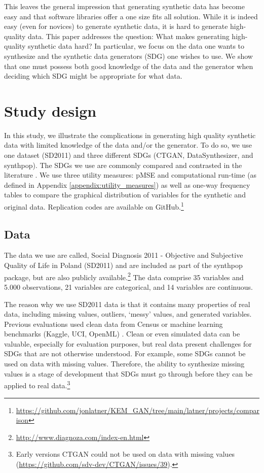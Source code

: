 \documentclass[runningheads]{llncs}
\begin{document}
This leaves the general impression that generating synthetic data has become easy and that software libraries offer a one size fits all solution. While it is indeed easy (even for novices) to generate synthetic data, it is hard to generate high-quality data. This paper addresses the question: What makes generating high-quality synthetic data hard? In particular, we focus on the data one wants to synthesize and the synthetic data generators (SDG) one wishes to use. We show that one must possess both good knowledge of the data and the generator when deciding which SDG might be appropriate for what data. 

\section{Study design}\label{sec:study_design}

In this study, we illustrate the complications in generating high quality synthetic data with limited knowledge of the data and/or the generator.  To do so, we use one dataset (SD2011) and three different SDGs  (CTGAN, DataSynthesizer, and synthpop). The SDGs we use are commonly compared and contrasted in the literature \cite{dankar2021fake,little2022comparing}.  We use three utility measures: pMSE and computational run-time (as defined in Appendix \ref{appendix:utility_measures}) as well as one-way frequency tables to compare the graphical distribution of variables for the synthetic and original data.  Replication codes are available on GitHub.\footnote{\url{https://github.com/jonlatner/KEM_GAN/tree/main/latner/projects/comparison}}

\subsection{Data}

The data we use are called, Social Diagnosis 2011 - Objective and Subjective Quality of Life in Poland (SD2011) and are included as part of the synthpop package, but are also publicly available.\footnote{ \url{http://www.diagnoza.com/index-en.html}}  The data comprise 35 variables and 5.000 observations, 21 variables are categorical, and 14 variables are continuous.  

The reason why we use SD2011 data is that it contains many properties of real data, including missing values, outliers, `messy' values, and generated variables.  Previous evaluations used clean data from Census \cite{little2022comparing} or machine learning benchmarks (Kaggle, UCI, OpenML) \cite{dankar2021fake}.  Clean or even simulated data can be valuable, especially for evaluation purposes, but real data present challenges for SDGs that are not otherwise understood.  For example, some SDGs cannot be used on data with missing values.  Therefore, the ability to synthesize missing values is a stage of development that SDGs must go through before they can be applied to real data.\footnote{Early versions CTGAN could not be used on data with missing values (\url{https://github.com/sdv-dev/CTGAN/issues/39}).}  
\end{document}
